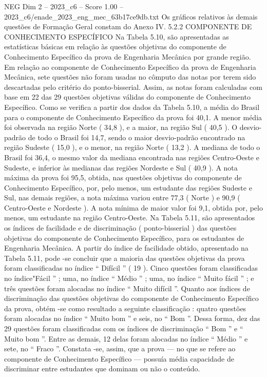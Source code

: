 \begin{textsample}{NEG Dim 2 – 2023\_c6 – Score 1.00 – 2023\_c6/enade\_2023\_eng\_mec\_63b17ce9db.txt}
Os gráficos relativos às demais questões de Formação Geral constam do Anexo IV. 5.2.2 COMPONENTE DE CONHECIMENTO ESPECÍFICO Na Tabela 5.10, são apresentadas as estatísticas básicas em relação às questões objetivas do componente de Conhecimento Específico da prova de Engenharia Mecânica por grande região.
Em relação ao componente de Conhecimento Específico da prova de Engenharia Mecânica, sete questões não foram usadas no cômputo das notas por terem sido descartadas pelo critério do ponto-bisserial.
Assim, as notas foram calculadas com base em 22 das 29 questões objetivas válidas do componente de Conhecimento Específico.
Como se verifica a partir dos dados da Tabela 5.10, a média do Brasil para o componente de Conhecimento Específico da prova foi 40,1.
A menor média foi observada na região Norte ( 34,8 ), e a maior, na região Sul ( 40,5 ).
O desvio-padrão de todo o Brasil foi 14,7, sendo o maior desvio-padrão encontrado na região Sudeste ( 15,0 ), e o menor, na região Norte ( 13,2 ).
A mediana de todo o Brasil foi 36,4, o mesmo valor da mediana encontrada nas regiões Centro-Oeste e Sudeste, e inferior às medianas das regiões Nordeste e Sul ( 40,9 ).
A nota máxima da prova foi 95,5, obtida, nas questões objetivas do componente de Conhecimento Específico, por, pelo menos, um estudante das regiões Sudeste e Sul, nas demais regiões, a nota máxima variou entre 77,3 ( Norte ) e 90,9 ( Centro-Oeste e Nordeste ).
A nota mínima de maior valor foi 9,1, obtida por, pelo menos, um estudante na região Centro-Oeste.
Na Tabela 5.11, são apresentados os índices de facilidade e de discriminação ( ponto-bisserial ) das questões objetivas do componente de Conhecimento Específico, para os estudantes de Engenharia Mecânica.
A partir do índice de facilidade obtido, apresentado na Tabela 5.11, pode -se concluir que a maioria das questões objetivas da prova foram classificadas no índice “ Difícil ” ( 19 ).
Cinco questões foram classificadas no índice"Fácil ” ; uma, no índice “ Médio ” ; uma, no índice “ Muito fácil ” ; e três questões foram alocadas no índice “ Muito difícil ”.
Quanto aos índices de discriminação das questões objetivas do componente de Conhecimento Específico da prova, obtém -se como resultado a seguinte classificação : quatro questões foram alocadas no índice “ Muito bom ” e seis, no “ Bom ”.
Dessa forma, dez das 29 questões foram classificadas com os índices de discriminação “ Bom ” e “ Muito bom ”.
Entre as demais, 12 delas foram alocadas no índice “ Médio ” e sete, no “ Fraco ”.
Constata -se, assim, que a prova — no que se refere ao componente de Conhecimento Específico — possuía média capacidade de discriminar entre estudantes que dominam ou não o conteúdo.

\end{textsample}
